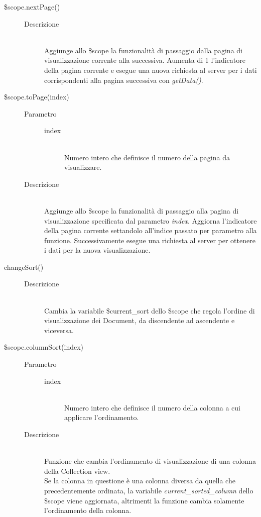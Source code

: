 \begin{description}
\begin{description}
  \item[\$scope.nextPage()] \hfill
  \begin{description}
  		\item[Descrizione] \hfill \\
  Aggiunge allo \$scope la funzionalità di passaggio dalla pagina di visualizzazione corrente alla successiva. Aumenta di 1 l'indicatore della pagina corrente e esegue una nuova richiesta al server per i dati corrispondenti alla pagina successiva con \emph{getData()}.
  \end{description}
  
  \item[\$scope.toPage(index)] \hfill
  \begin{description}
  	\item[Parametro] \hfill
  	\begin{description}
  		\item[index] \hfill \\
  		Numero intero che definisce il numero della pagina da visualizzare.
  	\end{description}
  	\item[Descrizione] \hfill \\
  Aggiunge allo \$scope la funzionalità di passaggio alla pagina di visualizzazione specificata dal parametro \emph{index}. Aggiorna l'indicatore della pagina corrente settandolo all'indice passato per parametro alla funzione. Successivamente esegue una richiesta al server per ottenere i dati per la nuova visualizzazione.
  \end{description}
  
  \item[changeSort()] \hfill 
  \begin{description}
  	\item[Descrizione] \hfill \\
  Cambia la variabile \$current\_sort dello \$scope che regola l'ordine di visualizzazione dei Document, da discendente ad ascendente e viceversa.
  \end{description}
  
  \item[\$scope.columnSort(index)] \hfill
  \begin{description}
  	\item[Parametro] \hfill
  	\begin{description}
  		\item[index] \hfill \\
  		Numero intero che definisce il numero della colonna a cui applicare l'ordinamento.
  	\end{description}
  	\item[Descrizione] \hfill \\
  Funzione che cambia l'ordinamento di visualizzazione di una colonna della Collection view. \\
  Se la colonna in questione è una colonna diversa da quella che precedentemente ordinata, la variabile \emph{current\_sorted\_column} dello \$scope viene aggiornata, altrimenti la funzione cambia solamente l'ordinamento della colonna.
  \end{description}
  

\end{description}
\end{description}
